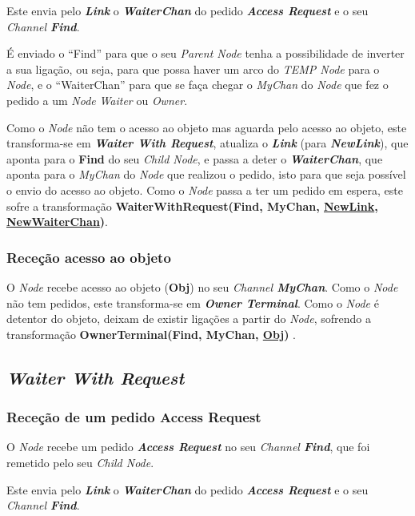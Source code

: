 Este envia pelo \textbf{\emph{Link}} o \textbf{\emph{WaiterChan}} do pedido \emph{\textbf{Access Request}} e o seu \emph{Channel \textbf{Find}}.

É enviado o ``Find'' para que o seu \emph{Parent Node} tenha a possibilidade de inverter a sua ligação, ou seja, para que possa haver um arco do \emph{TEMP Node} para o \emph{Node}, 
e o ``WaiterChan'' para que se faça chegar o \emph{MyChan} do \emph{Node} que fez o pedido a um \emph{Node} \emph{Waiter} ou \emph{Owner}.


Como o \emph{Node} não tem o acesso ao objeto mas aguarda pelo acesso ao objeto, este transforma-se em \emph{\textbf{Waiter With Request}}, atualiza o \textbf{\emph{Link}} (para \textbf{\emph{NewLink}}),
que aponta para o \textbf{Find} do seu \emph{Child Node}, 
e passa a deter o \textbf{\emph{WaiterChan}}, que aponta para o \emph{MyChan} do \emph{Node} que realizou o pedido, isto para que seja possível o envio do acesso ao objeto.
Como o \emph{Node} passa a ter um pedido em espera, este sofre a transformação \textbf{WaiterWithRequest(Find, MyChan, \underline{NewLink}, \underline{NewWaiterChan})}.


\subsubsection*{Receção acesso ao objeto}
O \emph{Node} recebe acesso ao objeto (\textbf{Obj}) no seu \emph{Channel \textbf{MyChan}}.
Como o \emph{Node} não tem pedidos, este transforma-se em \textbf{\emph{Owner Terminal}}.
Como o \emph{Node} é detentor do objeto, deixam de existir ligações a partir do \emph{Node}, sofrendo a transformação \textbf{ OwnerTerminal(Find, MyChan, \underline{Obj}) }.




\subsection*{\emph{Waiter With Request}}
\label{especificacao:nodes:waiter_with_request}


\subsubsection*{Receção de um pedido Access Request}
O \emph{Node} recebe um pedido \emph{\textbf{Access Request}} no seu \emph{Channel \textbf{Find}}, que foi remetido pelo seu \emph{Child Node}.

Este envia pelo \textbf{\emph{Link}} o \textbf{\emph{WaiterChan}} do pedido \emph{\textbf{Access Request}} e o seu \emph{Channel \textbf{Find}}.

